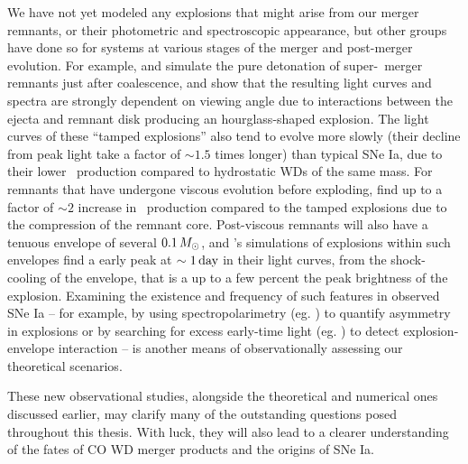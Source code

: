 We have not yet modeled any explosions that might arise from our merger remnants, or their photometric and spectroscopic appearance, but other groups have done so for systems at various stages of the merger and post-merger evolution.  For example, \cite{rask+14} and \cite{vros+15} simulate the pure detonation of super-\Mch\ merger remnants just after coalescence, and show that the resulting light curves and spectra are strongly dependent on viewing angle due to interactions between the ejecta and remnant disk producing an hourglass-shaped explosion.  The light curves of these ``tamped explosions'' also tend to evolve more slowly (their decline from peak light take a factor of $\sim1.5$ times longer) than typical SNe Ia, due to their lower \Ni\ production compared to hydrostatic WDs of the same mass.  For remnants that have undergone viscous evolution before exploding, \cite{rask+14} find up to a factor of $\sim2$ increase in \Ni\ production compared to the tamped explosions due to the compression of the remnant core.  Post-viscous remnants will also have a tenuous envelope of several $0.1\,\Msun$, and \cite{pirom15}'s simulations of explosions within such envelopes find a early peak at $\sim1\,\mathrm{day}$ in their light curves, from the shock-cooling of the envelope, that is a up to a few percent the peak brightness of the explosion. Examining the existence and frequency of such features in observed SNe Ia -- for example, by using spectropolarimetry (eg. \citealt{bullsk15}) to quantify asymmetry in explosions or by  searching for excess early-time light (eg. \citealt{mari+16}) to detect explosion-envelope interaction -- is another means of observationally assessing our theoretical scenarios.

These new observational studies, alongside the theoretical and numerical ones discussed earlier, may clarify many of the outstanding questions posed throughout this thesis.  With luck, they will also lead to a clearer understanding of the fates of CO WD merger products and the origins of SNe Ia.



